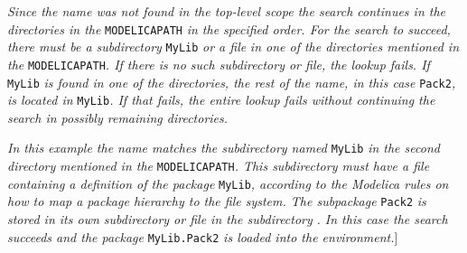 \emph{Since the name was not found in the top-level scope the search
continues in the directories in the} \lstinline!MODELICAPATH! \emph{in the specified
order. For the search to succeed, there must be a subdirectory} \lstinline!MyLib!
\emph{or a file}  \emph{in one of the directories mentioned in
the} \lstinline!MODELICAPATH!\emph{. If there is no such subdirectory or file, the
lookup fails. If} \lstinline!MyLib! \emph{is found in one of the directories, the
rest of the name, in this case} \lstinline!Pack2!\emph{, is located in} \lstinline!MyLib!\emph{.
If that fails, the entire lookup fails without continuing the search in
possibly remaining directories.}

\emph{In this example the name matches the subdirectory named} \lstinline!MyLib!
\emph{in the second directory} 
\emph{mentioned in the} \lstinline!MODELICAPATH!\emph{. This subdirectory must have
a file}  \emph{containing a definition of the package}
\lstinline!MyLib!\emph{, according to the Modelica rules on how to map a package
hierarchy to the file system. The subpackage} \lstinline!Pack2! \emph{is stored in
its own subdirectory or file in the subdirectory} \emph{. In this
case the search succeeds and the package} \lstinline!MyLib.Pack2! \emph{is loaded
into the environment.}{]}

